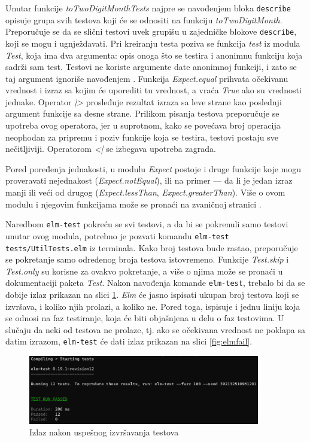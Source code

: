 \documentclass[12pt,oneside]{memoir}
\begin{document}
\par Unutar funkcije \emph{toTwoDigitMonthTests} najpre se navođenjem bloka \texttt{describe} opisuje grupa svih testova koji će se odnositi na funkciju \emph{toTwoDigitMonth}. Preporučuje se da se slični testovi uvek grupišu u zajedničke blokove \texttt{describe}, koji se mogu i ugnježdavati. Pri kreiranju testa poziva se funkcija \emph{test} iz modula \emph{Test}, koja ima dva argumenta: opis onoga što se testira i anonimnu funkciju koja sadrži sam test. Testovi ne koriste argumente date anonimnoj funkciji, i zato se taj argument ignoriše navođenjem \textunderscore. Funkcija \emph{Expect.equal} prihvata očekivanu vrednost i izraz sa kojim će uporediti tu vrednost, a vraća \emph{True} ako su vrednosti jednake. Operator \emph{|>} prosleđuje rezultat izraza sa leve strane kao poslednji argument funkcije sa desne strane. Prilikom pisanja testova preporučuje se upotreba ovog operatora, jer u suprotnom, kako se povećava broj operacija neophodan za pripremu i poziv funkcije koja se testira, testovi postaju sve nečitljiviji. Operatorom \emph{<|} se izbegava upotreba zagrada. 
\par Pored poređenja jednakosti, u modulu \emph{Expect} postoje i druge funkcije koje mogu proveravati nejednakost (\emph{Expect.notEqual}), ili na primer --- da li je jedan izraz manji ili veći od drugog (\emph{Expect.lessThan}, \emph{Expect.greaterThan}). Više o ovom modulu i njegovim funkcijama može se pronaći na zvaničnoj stranici \cite{expect}.
\par Naredbom \texttt{elm-test} pokreću se svi testovi, a da bi se pokrenuli samo testovi unutar ovog modula, potrebno je pozvati komandu \texttt{elm-test tests/UtilTests.elm} iz terminala. Kako broj testova bude rastao, preporučuje se pokretanje samo određenog broja testova istovremeno. Funkcije \emph{Test.skip} i \emph{Test.only} su korisne za ovakvo pokretanje, a više o njima može se pronaći u dokumentaciji paketa \emph{Test}.  Nakon navođenja komande \texttt{elm-test}, trebalo bi da se dobije izlaz prikazan na slici \ref{fig:elmpass}. \emph{Elm} će jasno ispisati ukupan broj testova koji se izvršava, i koliko njih prolazi, a koliko ne. Pored toga, ispisuje i jednu liniju koja se odnosi na faz testiranje, koja će biti objašnjena u delu o faz testovima. U slučaju da neki od testova ne prolaze, tj. ako se očekivana vrednost ne poklapa sa datim izrazom, \texttt{elm-test} će dati izlaz prikazan na slici \ref{fig:elmfail}. 

\begin{figure}[!ht]
  \centering
  \includegraphics[width=0.9\textwidth]{elmpass.png}
  \caption{Izlaz nakon uspešnog izvršavanja testova}
  \label{fig:elmpass}
\end{figure}
\end{document}

